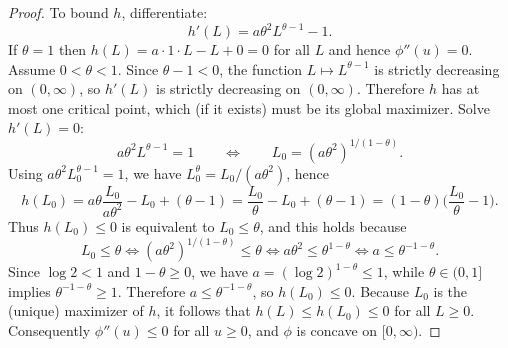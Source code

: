 \documentclass[12pt]{article}
\renewcommand{\(}{\left(}%
\renewcommand{\)}{\right)}%
\renewcommand{\[}{\left[}%
\renewcommand{\]}{\right]}%
\newtheorem{proof}{Proof.}}
\begin{document}
\begin{proof}
To bound $h$, differentiate:
\begin{equation*}
h'(L)=a\theta^2 L^{\theta-1}-1.
\end{equation*}
If $\theta=1$ then $h(L)=a\cdot 1\cdot L - L + 0=0$ for all $L$ and hence $\phi''(u)=0$. Assume $0<\theta<1$.
Since $\theta-1<0$, the function $L\mapsto L^{\theta-1}$ is strictly decreasing on $(0,\infty)$, so $h'(L)$ is strictly decreasing on $(0,\infty)$. Therefore $h$ has at most one critical point, which (if it exists) must be its global maximizer. Solve $h'(L)=0$:
\begin{equation*}
a\theta^2 L^{\theta-1}=1
\qquad\Longleftrightarrow\qquad
L_0=(a\theta^2)^{1/(1-\theta)}.
\end{equation*}
Using $a\theta^2 L_0^{\theta-1}=1$, we have $L_0^\theta = L_0/(a\theta^2)$, hence
\begin{equation*}
h(L_0)
=a\theta\frac{L_0}{a\theta^2}-L_0+(\theta-1)
=\frac{L_0}{\theta}-L_0+(\theta-1)
=(1-\theta)\Big(\frac{L_0}{\theta}-1\Big).
\end{equation*}
Thus $h(L_0)\le 0$ is equivalent to $L_0\le \theta$, and this holds because
\begin{equation*}
L_0\le \theta
\Longleftrightarrow
(a\theta^2)^{1/(1-\theta)}\le \theta
\Longleftrightarrow
a\theta^2\le \theta^{1-\theta}
\Longleftrightarrow
a\le \theta^{-1-\theta}.
\end{equation*}
Since $\log 2<1$ and $1-\theta\ge 0$, we have $a=(\log 2)^{1-\theta}\le 1$, while $\theta\in(0,1]$ implies $\theta^{-1-\theta}\ge 1$. Therefore $a\le \theta^{-1-\theta}$, so $h(L_0)\le 0$. Because $L_0$ is the (unique) maximizer of $h$, it follows that $h(L)\le h(L_0)\le 0$ for all $L\ge 0$. Consequently $\phi''(u)\le 0$ for all $u\ge 0$, and $\phi$ is concave on $[0,\infty)$.


\end{proof}
\end{document}
